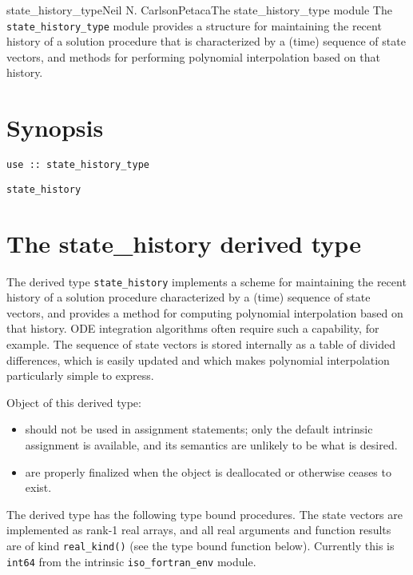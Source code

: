 \documentclass[11pt]{article}
\begin{document}

\begin{Name}{3}{state_history_type}{Neil N. Carlson}{Petaca}{The state_history_type module}
The \texttt{state_history_type} module provides a structure for maintaining
the recent history of a solution procedure that is characterized by a (time)
sequence of state vectors, and methods for performing polynomial interpolation
based on that history.
\end{Name}

\section{Synopsis}
\begin{description}[style=nextline]
\item[Usage]
  \texttt{use :: state_history_type}
\item[Derived Types]
  \texttt{state_history}
\end{description}

\section{The state_history derived type}
The derived type \texttt{state_history} implements a scheme for maintaining
the recent history of a solution procedure characterized by a (time) sequence
of state vectors, and provides a method for computing polynomial interpolation
based on that history.  ODE integration algorithms often require such a
capability, for example.  The sequence of state vectors is stored internally
as a table of divided differences, which is easily updated and which makes
polynomial interpolation particularly simple to express.

Object of this derived type:
\begin{itemize}\setlength{\itemsep}{0pt}
\item
  should not be used in assignment statements; only the default intrinsic
  assignment is available, and its semantics are unlikely to be what is
  desired.
\item
  are properly finalized when the object is deallocated or otherwise
  ceases to exist.
\end{itemize}

The derived type has the following type bound procedures.  The state vectors
are implemented as rank-1 real arrays, and all real arguments and function
results are of kind \texttt{real_kind()} (see the type bound function below).
Currently this is \texttt{int64} from the intrinsic \texttt{iso_fortran_env}
module.
\end{document}
